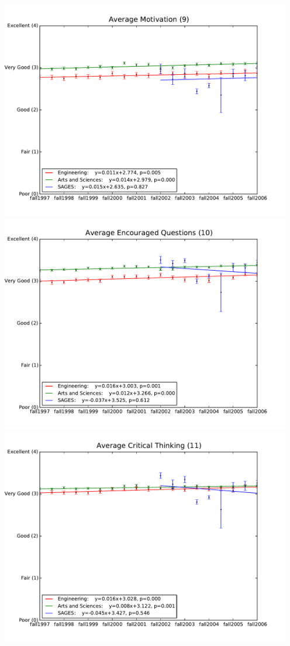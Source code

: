 \documentclass[12pt]{article}
\begin{document}
\begin{center}
    \includegraphics[width=5in]{figures/9_motivation_over_time.pdf} \\
    \includegraphics[width=5in]{figures/10_questions_over_time.pdf} \\
    \includegraphics[width=5in]{figures/11_critthink_over_time.pdf} \\

\end{center}
\end{document}
